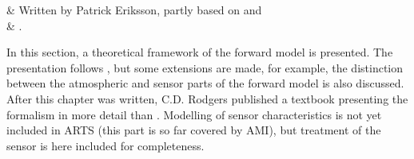 %
%
 \label{sec:formalism}

%
%
 & Written by Patrick Eriksson, partly 
           based on \citet{eriksson:99} and \\ & \citet{eriksson:00a}. \\
\stophistory



%
%
In this section, a theoretical framework of the forward model is
presented. The presentation follows \citet{rodgers:90}, but some
extensions are made, for example, the distinction between the
atmospheric and sensor parts of the forward model is also discussed.
After this chapter was written, C.D. Rodgers published a textbook
\citep{rodgers:00} presenting the formalism in more detail than
\citet{rodgers:90}. Modelling of sensor characteristics is not yet
included in ARTS (this part is so far covered by AMI), but treatment
of the sensor is here included for completeness.



 \label{sec:formalism:fm}
 
